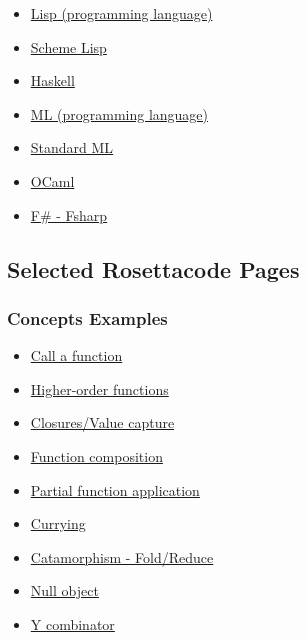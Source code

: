 \documentclass[11pt]{article}
\begin{document}
\begin{itemize}
\item \href{https://en.wikipedia.org/wiki/Lisp_\%28programming_language\%29}{Lisp (programming language)}
\item \href{https://en.wikipedia.org/wiki/Scheme_\%28programming_language\%29}{Scheme Lisp}
\item \href{https://en.wikipedia.org/wiki/Haskell}{Haskell}
\item \href{https://en.wikipedia.org/wiki/ML_\%28programming_language\%29}{ML (programming language)}
\item \href{https://en.wikipedia.org/wiki/Standard_ML}{Standard ML}
\item \href{https://en.wikipedia.org/wiki/OCaml}{OCaml}
\item \href{https://en.wikipedia.org/wiki/F_Sharp_\%28programming_language\%29}{F\# - Fsharp}
\end{itemize}

\subsection{Selected Rosettacode Pages}
\label{sec-4-2}
\subsubsection{Concepts Examples}
\label{sec-4-2-1}

\begin{itemize}
\item \href{http://rosettacode.org/wiki/Call_a_function}{Call a function}

\item \href{http://rosettacode.org/wiki/Higher-order_functions}{Higher-order functions}

\item \href{http://rosettacode.org/wiki/Closures/Value_capture}{Closures/Value capture}

\item \href{http://rosettacode.org/wiki/Function_composition}{Function composition}

\item \href{http://rosettacode.org/wiki/Partial_function_application}{Partial function application}

\item \href{http://rosettacode.org/wiki/Currying}{Currying}

\item \href{http://rosettacode.org/wiki/Catamorphism}{Catamorphism - Fold/Reduce}

\item \href{http://rosettacode.org/wiki/Null_object}{Null object}

\item \href{http://rosettacode.org/wiki/Y_combinator}{Y combinator}
\end{itemize}
\end{document}
